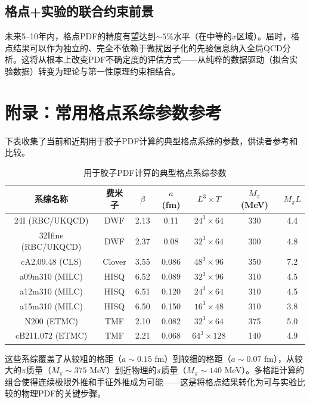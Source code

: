 \documentclass[11pt,a4paper]{ctexart}
\begin{document}
\subsection{格点+实验的联合约束前景}

未来5--10年内，格点PDF的精度有望达到$\sim 5\%$水平（在中等的$x$区域）。届时，格点结果可以作为独立的、完全不依赖于微扰因子化的先验信息纳入全局QCD分析。这将从根本上改变PDF不确定度的评估方式——从纯粹的数据驱动（拟合实验数据）转变为理论与第一性原理约束相结合。

\section{附录：常用格点系综参数参考}

下表收集了当前和近期用于胶子PDF计算的典型格点系综的参数，供读者参考和比较。

\begin{table}[htbp]
\centering
\caption{用于胶子PDF计算的典型格点系综参数}
\begin{tabular}{c c c c c c c}
\toprule
\textbf{系综名称} & \textbf{费米子} & \textbf{$\beta$} & \textbf{$a$ (fm)} & \textbf{$L^3\times T$} & \textbf{$M_\pi$ (MeV)} & \textbf{$M_\pi L$} \\
\midrule
24I (RBC/UKQCD) & DWF & 2.13 & 0.11 & $24^3\times64$ & 330 & 4.4 \\
32Ifine (RBC/UKQCD) & DWF & 2.37 & 0.08 & $32^3\times64$ & 300 & 4.8 \\
cA2.09.48 (CLS) & Clover & 3.55 & 0.086 & $48^3\times96$ & 350 & 7.2 \\
a09m310 (MILC) & HISQ & 6.52 & 0.089 & $32^3\times96$ & 310 & 4.5 \\
a12m310 (MILC) & HISQ & 6.51 & 0.120 & $24^3\times64$ & 310 & 4.5 \\
a15m310 (MILC) & HISQ & 6.50 & 0.150 & $16^3\times48$ & 310 & 3.8 \\
N200 (ETMC) & TMF & 2.10 & 0.082 & $32^3\times64$ & 375 & 5.0 \\
cB211.072 (ETMC) & TMF & 2.21 & 0.068 & $64^3\times128$ & 140 & 4.9 \\
\bottomrule
\end{tabular}
\end{table}

这些系综覆盖了从较粗的格距（$a\sim 0.15$ fm）到较细的格距（$a\sim 0.07$ fm），从较大的$\pi$质量（$M_\pi \sim 375$ MeV）到近物理的$\pi$质量（$M_\pi \sim 140$ MeV）。多格距计算的组合使得连续极限外推和手征外推成为可能——这是将格点结果转化为可与实验比较的物理PDF的关键步骤。
\end{document}
